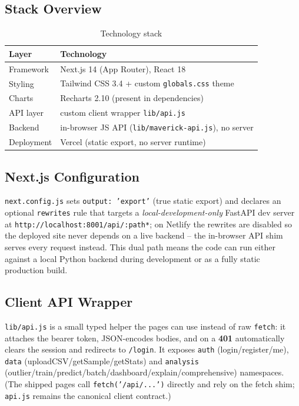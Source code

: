 \documentclass[11pt,a4paper]{article}
\newcommand{\code}[1]{\texttt{\small #1}}
\begin{document}
\subsection{Stack Overview}
\begin{table}[h]
  \centering
  \caption{Technology stack}
  \vspace{0.3cm}
  \begin{tabular}{ll}
    \toprule
    \textbf{Layer} & \textbf{Technology} \\
    \midrule
    Framework       & Next.js 14 (App Router), React 18 \\
    Styling         & Tailwind CSS 3.4 + custom \texttt{globals.css} theme \\
    Charts          & Recharts 2.10 (present in dependencies) \\
    API layer       & custom client wrapper \code{lib/api.js} \\
    Backend         & in-browser JS API (\code{lib/maverick-api.js}), no server \\
    Deployment      & Vercel (static export, no server runtime) \\
    \bottomrule
  \end{tabular}
\end{table}

\subsection{Next.js Configuration}
\code{next.config.js} sets \code{output: 'export'} (true static export) and declares an
optional \code{rewrites} rule that targets a \emph{local-development-only} FastAPI dev server at
\code{http://localhost:8001/api/:path*}; on Netlify the rewrites are disabled so the deployed
site never depends on a live backend -- the in-browser API shim serves every request instead.
This dual path means the code can run either against a local Python backend during development
or as a fully static production build.

\subsection{Client API Wrapper}
\code{lib/api.js} is a small typed helper the pages can use instead of raw \code{fetch}:
it attaches the bearer token, JSON-encodes bodies, and on a \textbf{401} automatically clears
the session and redirects to \code{/login}. It exposes \code{auth} (login/register/me),
\code{data} (uploadCSV/getSample/getStats) and \code{analysis}
(outlier/train/predict/batch/dashboard/explain/comprehensive) namespaces. (The shipped pages
call \code{fetch('/api/...')} directly and rely on the fetch shim; \code{api.js} remains the
canonical client contract.)
\end{document}

